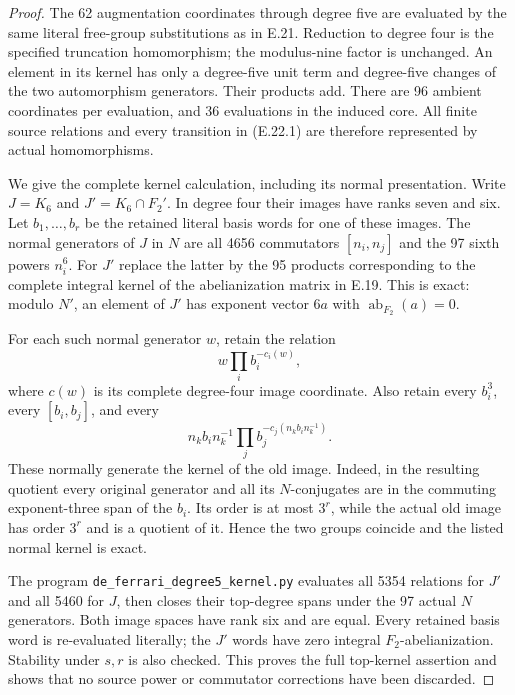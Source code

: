 \begin{proof}
The 62 augmentation coordinates through
degree five are evaluated by the same
literal free-group substitutions as in
E.21. Reduction to degree four is the
specified truncation homomorphism;
the modulus-nine factor is unchanged.
An element in its kernel has only a
degree-five unit term and degree-five
changes of the two automorphism
generators. Their products add. There
are 96 ambient coordinates per
evaluation, and 36 evaluations in
the induced core. All finite source
relations and every transition in
(E.22.1) are therefore represented
by actual homomorphisms.

We give the complete kernel
calculation, including its normal
presentation. Write $J=K_6$ and
$J'=K_6\cap F_2'$. In degree four
their images have ranks seven and
six. Let $b_1,\ldots,b_r$ be the
retained literal basis words for
one of these images. The normal
generators of $J$ in $N$ are all
4656 commutators $[n_i,n_j]$ and
the 97 sixth powers $n_i^6$.
For $J'$ replace the latter by
the 95 products corresponding
to the complete integral kernel
of the abelianization matrix in
E.19. This is exact: modulo
$N'$, an element of $J'$ has
exponent vector $6a$ with
$\operatorname{ab}_{F_2}(a)=0$.

For each such normal generator
$w$, retain the relation
\[
              w\prod_i b_i^{-c_i(w)},
 \tag{E.22.4}
\]
where $c(w)$ is its complete
degree-four image coordinate.
Also retain every $b_i^3$,
every $[b_i,b_j]$, and every
\[
 n_kb_i n_k^{-1}
        \prod_j b_j^{-c_j(n_kb_i n_k^{-1})}.
 \tag{E.22.5}
\]
These normally generate the
kernel of the old image. Indeed,
in the resulting quotient every
original generator and all its
$N$-conjugates are in the
commuting exponent-three span
of the $b_i$. Its order is at
most $3^r$, while the actual
old image has order $3^r$ and
is a quotient of it. Hence the
two groups coincide and the
listed normal kernel is exact.

The program
\texttt{de\_ferrari\_degree5\_kernel.py}
evaluates all 5354 relations
for $J'$ and all 5460 for $J$,
then closes their top-degree
spans under the 97 actual
$N$ generators. Both image
spaces have rank six and are
equal. Every retained basis
word is re-evaluated literally;
the $J'$ words have zero
integral $F_2$-abelianization.
Stability under $s,r$ is also
checked. This proves the full
top-kernel assertion and shows
that no source power or
commutator corrections have
been discarded.


\end{proof}
